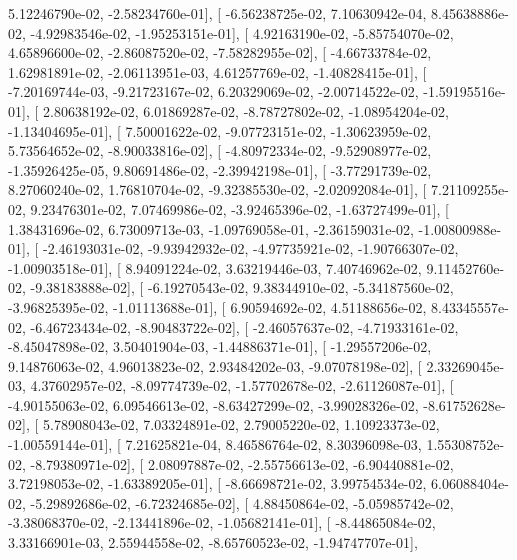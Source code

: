 \documentclass{article}
\begin{document}
          5.12246790e-02,  -2.58234760e-01],
       [ -6.56238725e-02,   7.10630942e-04,   8.45638886e-02,
         -4.92983546e-02,  -1.95253151e-01],
       [  4.92163190e-02,  -5.85754070e-02,   4.65896600e-02,
         -2.86087520e-02,  -7.58282955e-02],
       [ -4.66733784e-02,   1.62981891e-02,  -2.06113951e-03,
          4.61257769e-02,  -1.40828415e-01],
       [ -7.20169744e-03,  -9.21723167e-02,   6.20329069e-02,
         -2.00714522e-02,  -1.59195516e-01],
       [  2.80638192e-02,   6.01869287e-02,  -8.78727802e-02,
         -1.08954204e-02,  -1.13404695e-01],
       [  7.50001622e-02,  -9.07723151e-02,  -1.30623959e-02,
          5.73564652e-02,  -8.90033816e-02],
       [ -4.80972334e-02,  -9.52908977e-02,  -1.35926425e-05,
          9.80691486e-02,  -2.39942198e-01],
       [ -3.77291739e-02,   8.27060240e-02,   1.76810704e-02,
         -9.32385530e-02,  -2.02092084e-01],
       [  7.21109255e-02,   9.23476301e-02,   7.07469986e-02,
         -3.92465396e-02,  -1.63727499e-01],
       [  1.38431696e-02,   6.73009713e-03,  -1.09769058e-01,
         -2.36159031e-02,  -1.00800988e-01],
       [ -2.46193031e-02,  -9.93942932e-02,  -4.97735921e-02,
         -1.90766307e-02,  -1.00903518e-01],
       [  8.94091224e-02,   3.63219446e-03,   7.40746962e-02,
          9.11452760e-02,  -9.38183888e-02],
       [ -6.19270543e-02,   9.38344910e-02,  -5.34187560e-02,
         -3.96825395e-02,  -1.01113688e-01],
       [  6.90594692e-02,   4.51188656e-02,   8.43345557e-02,
         -6.46723434e-02,  -8.90483722e-02],
       [ -2.46057637e-02,  -4.71933161e-02,  -8.45047898e-02,
          3.50401904e-03,  -1.44886371e-01],
       [ -1.29557206e-02,   9.14876063e-02,   4.96013823e-02,
          2.93484202e-03,  -9.07078198e-02],
       [  2.33269045e-03,   4.37602957e-02,  -8.09774739e-02,
         -1.57702678e-02,  -2.61126087e-01],
       [ -4.90155063e-02,   6.09546613e-02,  -8.63427299e-02,
         -3.99028326e-02,  -8.61752628e-02],
       [  5.78908043e-02,   7.03324891e-02,   2.79005220e-02,
          1.10923373e-02,  -1.00559144e-01],
       [  7.21625821e-04,   8.46586764e-02,   8.30396098e-03,
          1.55308752e-02,  -8.79380971e-02],
       [  2.08097887e-02,  -2.55756613e-02,  -6.90440881e-02,
          3.72198053e-02,  -1.63389205e-01],
       [ -8.66698721e-02,   3.99754534e-02,   6.06088404e-02,
         -5.29892686e-02,  -6.72324685e-02],
       [  4.88450864e-02,  -5.05985742e-02,  -3.38068370e-02,
         -2.13441896e-02,  -1.05682141e-01],
       [ -8.44865084e-02,   3.33166901e-03,   2.55944558e-02,
         -8.65760523e-02,  -1.94747707e-01],
\end{document}
